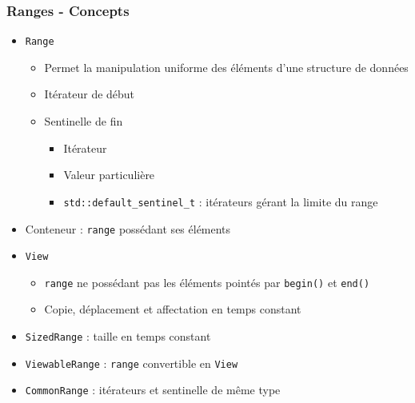 \documentclass[C++.tex]{subfiles}
\begin{document}
\begin{frame}[fragile]
	\frametitle{Ranges - Concepts}
	\begin{itemize}
		\item \lstinline|Range|
		\begin{itemize}
			\item Permet la manipulation uniforme des éléments d'une structure de données
			\item Itérateur de début
			\item Sentinelle de fin
			\begin{itemize}
				\item Itérateur
				\item Valeur particulière
				\item \lstinline|std::default_sentinel_t| : itérateurs gérant la limite du range

			\end{itemize}
		\end{itemize}

		\item Conteneur : \lstinline|range| possédant ses éléments
		\item \lstinline|View| 
		\begin{itemize}
			\item \lstinline|range| ne possédant pas les éléments pointés par \lstinline|begin()| et \lstinline|end()|
			\item Copie, déplacement et affectation en temps constant
		\end{itemize}
		\item \lstinline|SizedRange| : taille en temps constant
		\item \lstinline|ViewableRange| : \lstinline|range| convertible en \lstinline|View|
		\item \lstinline|CommonRange| : itérateurs et sentinelle de même type
	\end{itemize}
\end{frame}
\end{document}
